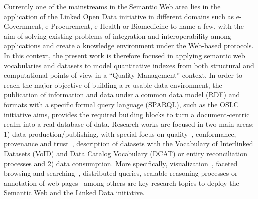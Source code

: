 % 
Currently one of the mainstreams in the Semantic Web area lies in the application of the Linked Open Data initiative in 
different domains such as  e-Government, e-Procurement, e-Health or Biomedicine to name a few,  
with the aim of solving existing problems of integration and interoperability among applications and create a 
knowledge environment under the Web-based protocols. In this context, the present work is therefore focused 
in applying semantic web vocabularies and datasets to model quantitative indexes from both structural 
and computational points of view in a ``Quality Management'' context. In order to reach the major objective of building a re-usable data environment,  
the publication of information and data under a common data model (RDF) and formats with 
a specific formal query language (SPARQL), such as the OSLC initiative aims, provides the required building blocks to turn 
a document-centric realm into a real database of data. Research works are focused in two main areas: 1) data production/publishing, 
with special focus on quality~\cite{Bizer:2009:QIF:1482178.1482280}, conformance, provenance and trust~\cite{w3c-prov}, description of datasets with the Vocabulary of Interlinked Datasets (VoID) 
and Data Catalog Vocabulary (DCAT) or entity reconciliation~\cite{Maali_Cyganiak_2011} processes and 2) data consumption. More specifically, visualization~\cite{DBLP:journals/semweb/DadzieR11}, 
faceted browsing and searching~\cite{hoga-etal-2011-swse-JWS}, distributed queries, scalable reasoning processes or annotation of 
web pages~\cite{rdfa-primer} among others are key research topics to deploy the Semantic Web and the Linked Data initiative.

